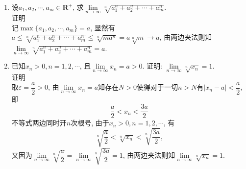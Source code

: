 \documentclass[UTF8,a4paper,20pt]{article}
\begin{document}
\begin{enumerate}
\item 设$a_1,a_2,\cdots,a_m\in\mathbf{R}^+$, 求$\lim\limits_{n\to\infty}\sqrt[n]{a_1^n+a_2^n+\cdots+a_m^n}$.\\
{\heiti 证明}\\
记$\max\{a_1,a_2,\cdots,a_m\}=a$, 显然有$a\leqslant\sqrt[n]{a_1^n+a_2^n+\cdots+a_m^n}\leqslant\sqrt[n]{ma^n}=a\sqrt[n]{m}\to a$, 由两边夹法则知$\lim\limits_{n\to\infty}\sqrt[n]{a_1^n+a_2^n+\cdots+a_m^n}=a$.

\item 已知$x_n>0, n=1,2,\cdots$, 且$\lim\limits_{n\to\infty}x_n=a>0$. 证明: $\lim\limits_{n\to\infty}\sqrt[n]{x_n}=1$.\\
{\heiti 证明}\\
取$\varepsilon=\dfrac{a}{2}>0$, 由$\lim\limits_{n\to\infty}x_n=a$知存在$N>0$使得对于一切$n>N$有$|x_n-a|<\dfrac{a}{2}$, 即
\[\dfrac{a}{2}<x_n<\dfrac{3a}{2}\]
不等式两边同时开$n$次根号, 由于$x_n>0,n=1,2,\cdots$, 有
\[\sqrt[n]{\dfrac{a}{2}}<\sqrt[n]{x_n}<\sqrt[n]{\dfrac{3a}{2}},\]
又因为$\lim\limits_{n\to\infty}\sqrt[n]{\dfrac{a}{2}}=\lim\limits_{n\to\infty}\sqrt[n]{\dfrac{3a}{2}}=1$, 由两边夹法则知$\lim\limits_{n\to\infty}\sqrt[n]{x_n}=1$.


\end{enumerate}
\end{document}
